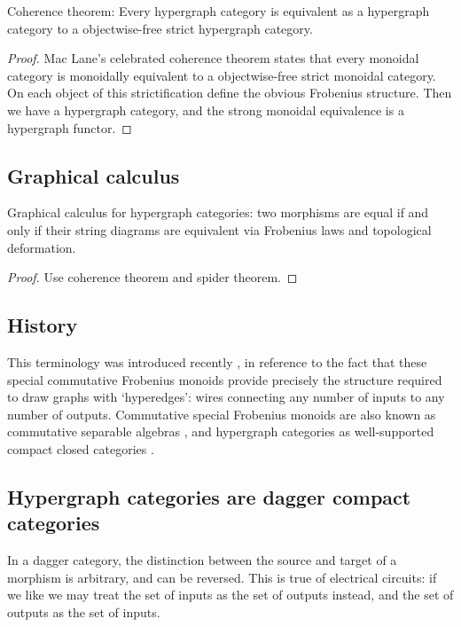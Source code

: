 \begin{proposition}
  Coherence theorem: Every hypergraph category is equivalent as a hypergraph category to a
  objectwise-free strict hypergraph category.
\end{proposition}
\begin{proof}
  Mac Lane's celebrated coherence theorem states that every monoidal category is
  monoidally equivalent to a objectwise-free strict monoidal category. On each
  object of this strictification define the obvious Frobenius structure. Then
  we have a hypergraph category, and the strong monoidal equivalence is a
  hypergraph functor.
\end{proof}


\subsection{Graphical calculus}
\begin{proposition}
  Graphical calculus for hypergraph categories: two morphisms are equal if and
  only if their string diagrams are equivalent via Frobenius laws and
  topological deformation.
\end{proposition}
\begin{proof}
  Use coherence theorem and spider theorem.
\end{proof}

\subsection{History}
This terminology was introduced recently \cite{Ki}, in reference to the fact
that these special commutative Frobenius monoids provide precisely the structure
required to draw graphs with `hyperedges': wires connecting any number of
inputs to any number of outputs. Commutative special Frobenius monoids are also
known as commutative separable algebras \cite{RSW}, and hypergraph categories as
well-supported compact closed categories \cite{Ca}.


\subsection{Hypergraph categories are dagger compact categories} \label{subsec:dagger}

In a dagger category, the distinction between the source and target of a morphism is arbitrary, and can be reversed. This is true of electrical circuits: if we like we may treat the set of inputs as the set of outputs instead, and the set of outputs as the set of inputs.

